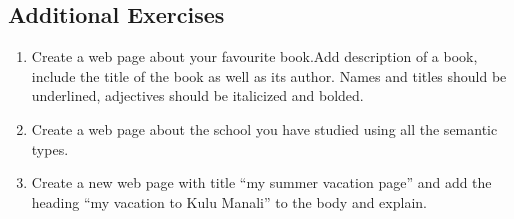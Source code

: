 \documentclass[11pt,a4paper]{article}
\begin{document}
\subsection*{Additional Exercises}
\begin{enumerate}
\item Create a web page about your favourite book.Add description of a book, include the title of the book as well as its author. Names and titles should be underlined, adjectives should be italicized and bolded.
\item Create a web page about the school you have studied using all the semantic types.
\item Create a new web page with title ``my summer vacation page'' and add the heading ``my vacation to Kulu Manali'' to the body and explain.
\end{enumerate}
\end{document}
